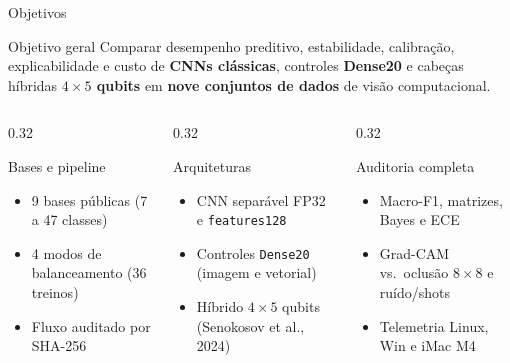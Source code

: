 \documentclass[aspectratio=169,11pt,brazil]{beamer}
\begin{document}
\begin{frame}{Objetivos}
  \begin{block}{Objetivo geral}
    Comparar desempenho preditivo, estabilidade, calibração, explicabilidade e custo de \textbf{CNNs clássicas}, controles \textbf{Dense20} e cabeças híbridas \textbf{$4\times 5$ qubits} em \textbf{nove conjuntos de dados} de visão computacional.
  \end{block}
  \vspace{0.2cm}
  \begin{columns}[T,onlytextwidth]
    \begin{column}{0.32\textwidth}
      \begin{block}{Bases e pipeline}
        \begin{itemize}\setlength{\itemsep}{3pt}
          \item 9 bases públicas (7 a 47 classes)
          \item 4 modos de balanceamento (36 treinos)
          \item Fluxo auditado por SHA-256
        \end{itemize}
      \end{block}
    \end{column}
    \begin{column}{0.32\textwidth}
      \begin{block}{Arquiteturas}
        \begin{itemize}\setlength{\itemsep}{3pt}
          \item CNN separável FP32 e \texttt{features128}
          \item Controles \texttt{Dense20} (imagem e vetorial)
          \item Híbrido $4\times 5$ qubits (Senokosov et al., 2024)
        \end{itemize}
      \end{block}
    \end{column}
    \begin{column}{0.32\textwidth}
      \begin{block}{Auditoria completa}
        \begin{itemize}\setlength{\itemsep}{3pt}
          \item Macro-F1, matrizes, Bayes e ECE
          \item Grad-CAM vs.\ oclusão $8\times 8$ e ruído/shots
          \item Telemetria Linux, Win e iMac M4
        \end{itemize}
      \end{block}
    \end{column}
  \end{columns}
\end{frame}
\end{document}
